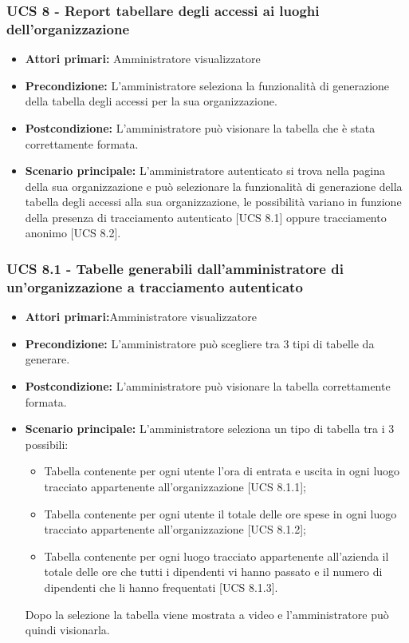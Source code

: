\subsubsection{UCS 8 - Report tabellare degli accessi ai luoghi dell'organizzazione}%
\begin{itemize}
\item \textbf{Attori primari:} Amministratore visualizzatore
\item \textbf{Precondizione:} L'amministratore seleziona la funzionalità di generazione della tabella degli accessi per la sua organizzazione.
\item \textbf{Postcondizione:} L'amministratore può visionare la tabella che è stata correttamente formata.
\item \textbf{Scenario principale:} L'amministratore autenticato si trova nella pagina della sua organizzazione e può selezionare la funzionalità di generazione della tabella degli accessi alla sua organizzazione, le possibilità variano in funzione della presenza di tracciamento autenticato [UCS 8.1] oppure tracciamento anonimo [UCS 8.2].
\end{itemize}

\subsubsection{UCS 8.1 - Tabelle generabili dall'amministratore di un'organizzazione a tracciamento autenticato}%
\begin{itemize}
\item \textbf{Attori primari:}Amministratore visualizzatore
\item \textbf{Precondizione:} L'amministratore può scegliere tra 3 tipi di tabelle da generare.
\item \textbf{Postcondizione:} L'amministratore può visionare la tabella correttamente formata.
\item \textbf{Scenario principale:} L'amministratore seleziona un tipo di tabella tra i 3 possibili:
	\begin{itemize}%
	\item Tabella contenente per ogni utente l'ora di entrata e uscita in ogni luogo tracciato appartenente all'organizzazione [UCS 8.1.1];
	\item Tabella contenente per ogni utente il totale delle ore spese in ogni luogo tracciato appartenente all'organizzazione [UCS 8.1.2];
	\item Tabella contenente per ogni luogo tracciato appartenente all'azienda il totale delle ore che tutti i dipendenti vi hanno passato e il numero di dipendenti che li hanno frequentati [UCS 8.1.3].
\end{itemize}
Dopo la selezione la tabella viene mostrata a video e l'amministratore può quindi visionarla.
\end{itemize}

